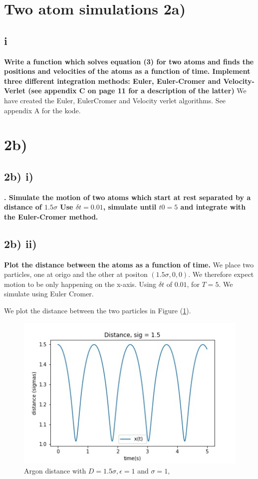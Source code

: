 
\section*{Two atom simulations 2a)}
\subsection*{i}
\textbf{Write a function which solves equation (3) for two atoms and finds the positions and velocities
of the atoms as a function of time. Implement three different integration methods: Euler,
Euler-Cromer and Velocity-Verlet (see appendix C on page 11 for a description of the latter)}
We have created the Euler, EulerCromer and Velocity verlet algorithms. See appendix A for the kode. 

\section*{2b)}

\subsection*{2b) i)}
\textbf{. Simulate the motion of two atoms which start at rest separated by a distance of $1.5\sigma$ Use $\delta t  = 0.01$, simulate until $t
0 = 5$ and integrate with the Euler-Cromer method.}

\subsection*{2b) ii)}
\textbf{Plot the distance between the atoms as a function of time.}
We place two particles, one at origo and the other at positon  $(1.5\sigma, 0, 0)$. We therefore expect motion to be only happening on the x-axis. Using $\delta t$ of $0.01$, for $T = 5$. We simulate using Euler Cromer.

We plot the distance between the two particles in Figure (\ref{fig:two-particle-distance-15}).
\begin{figure}[h!]
        \centering 
        \includegraphics[scale=0.8]{./py/two-particle-distance-15.jpg} 
        \caption{Argon distance  with $D = 1.5 \sigma, \epsilon = 1$ and $\sigma = 1$, }
        \label{fig:two-particle-distance-15}
\end{figure}

